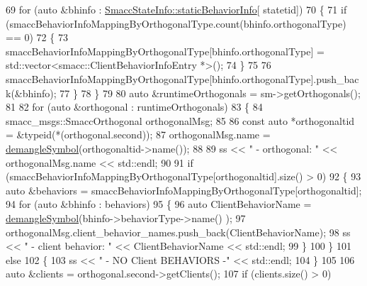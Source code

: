 \begin{DoxyCode}
69                 \textcolor{keywordflow}{for} (\textcolor{keyword}{auto} &bhinfo : \hyperlink{classsmacc_1_1introspection_1_1SmaccStateInfo_ad3d8b3450060cb0b91f38fb2fe0a7678}{SmaccStateInfo::staticBehaviorInfo}[
      statetid])
70                 \{
71                     \textcolor{keywordflow}{if} (smaccBehaviorInfoMappingByOrthogonalType.count(bhinfo.orthogonalType) == 0)
72                     \{
73                         smaccBehaviorInfoMappingByOrthogonalType[bhinfo.orthogonalType] = 
      std::vector<smacc::ClientBehaviorInfoEntry *>();
74                     \}
75 
76                     smaccBehaviorInfoMappingByOrthogonalType[bhinfo.orthogonalType].push\_back(&bhinfo);
77                 \}
78             \}
79 
80             \textcolor{keyword}{auto} &runtimeOrthogonals = sm->getOrthogonals();
81 
82             \textcolor{keywordflow}{for} (\textcolor{keyword}{auto} &orthogonal : runtimeOrthogonals)
83             \{
84                 smacc\_msgs::SmaccOrthogonal orthogonalMsg;
85 
86                 \textcolor{keyword}{const} \textcolor{keyword}{auto} *orthogonaltid = &\textcolor{keyword}{typeid}(*(orthogonal.second));
87                 orthogonalMsg.name = \hyperlink{namespacesmacc_1_1introspection_a2f495108db3e57604d8d3ff5ef030302}{demangleSymbol}(orthogonaltid->name());
88 
89                 ss << \textcolor{stringliteral}{" - orthogonal: "} << orthogonalMsg.name << std::endl;
90 
91                 \textcolor{keywordflow}{if} (smaccBehaviorInfoMappingByOrthogonalType[orthogonaltid].size() > 0)
92                 \{
93                     \textcolor{keyword}{auto} &behaviors = smaccBehaviorInfoMappingByOrthogonalType[orthogonaltid];
94                     \textcolor{keywordflow}{for} (\textcolor{keyword}{auto} &bhinfo : behaviors)
95                     \{
96                         \textcolor{keyword}{auto} ClientBehaviorName = \hyperlink{namespacesmacc_1_1introspection_a2f495108db3e57604d8d3ff5ef030302}{demangleSymbol}(bhinfo->behaviorType->name()
      );
97                         orthogonalMsg.client\_behavior\_names.push\_back(ClientBehaviorName);
98                         ss << \textcolor{stringliteral}{"          - client behavior: "} << ClientBehaviorName << std::endl;
99                     \}
100                 \}
101                 \textcolor{keywordflow}{else}
102                 \{
103                     ss << \textcolor{stringliteral}{"          - NO Client BEHAVIORS -"} << std::endl;
104                 \}
105 
106                 \textcolor{keyword}{auto} &clients = orthogonal.second->getClients();
107                 \textcolor{keywordflow}{if} (clients.size() > 0)

\end{DoxyCode}
